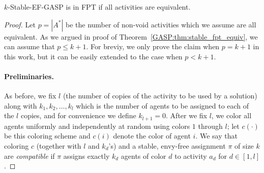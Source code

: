 \begin{theorem} \label{GASP:thm:stable_ef_equiv_fpt}
$k$-Stable-EF-GASP is in FPT if all activities are equivalent.
\end{theorem}
\begin{proof}
	Let $p = |A^*|$ be the number of non-void activities which we assume are all equivalent. As we argued in proof of Theorem~\ref{GASP:thm:stable_fpt_equiv}, we can assume that $p \leq k+1$. For breviy, we only prove the claim when $p = k+1$ in this work, but it can be easily extended to the case when $p < k + 1$.

	\paragraph{Preliminaries.}
	As before, we fix $l$ (the number of copies of the activity to be used by a solution) along with $k_1, k_2, \dots, k_l$ which is the number of agents to be assigned to each of the $l$ copies, and for convenience we define $k_{l+1}=0$.
	After we fix $l$, we color all agents uniformly and independently at random using colors $1$ through $l$; let $c(\cdot)$ be this coloring scheme and $c(i)$ denote the color of agent $i$. 
	We say that coloring $c$ (together with $l$ and $k_d$'s) and a stable, envy-free assignment $\pi$ of size $k$ are {\em compatible} if $\pi$ assigns exactly $k_d$ agents of color $d$ to activity $a_d$ for $d\in [1, l]$.


\end{proof}
